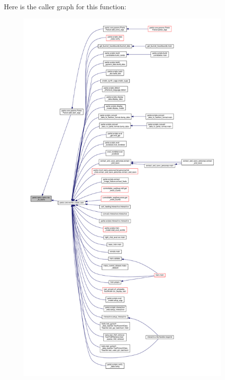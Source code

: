 Here is the caller graph for this function\+:
\nopagebreak
\begin{figure}[H]
\begin{center}
\leavevmode
\includegraphics[height=550pt]{namespaceparlai_1_1tasks_1_1tasks_ad536d1295ca5ba2ecf3a48635b482087_icgraph}
\end{center}
\end{figure}
